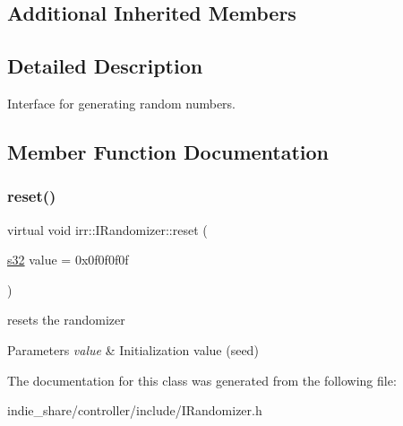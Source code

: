 \subsection*{Additional Inherited Members}


\subsection{Detailed Description}
Interface for generating random numbers. 

\subsection{Member Function Documentation}
\mbox{\label{classirr_1_1IRandomizer_ac9d7c9464698f6e183992fb895fa5ac4}} 
\subsubsection{\texorpdfstring{reset()}{reset()}}
{\footnotesize\ttfamily virtual void irr\+::\+I\+Randomizer\+::reset (\begin{DoxyParamCaption}\item[{\hyperlink{namespaceirr_ac66849b7a6ed16e30ebede579f9b47c6}{s32}}]{value = {\ttfamily 0x0f0f0f0f} }\end{DoxyParamCaption})\hspace{0.3cm}{\ttfamily [pure virtual]}}



resets the randomizer 


\begin{DoxyParams}{Parameters}
{\em value} & Initialization value (seed) \\
\hline
\end{DoxyParams}


The documentation for this class was generated from the following file\+:\begin{DoxyCompactItemize}
\item 
indie\+\_\+share/controller/include/I\+Randomizer.\+h\end{DoxyCompactItemize}
